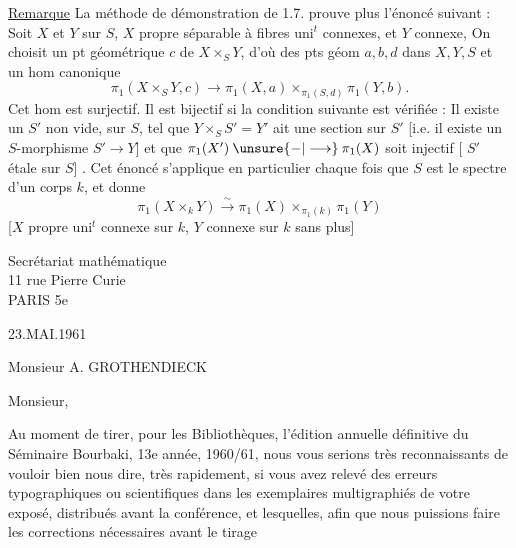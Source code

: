 \uline{Remarque} La méthode de démonstration de 1.7. prouve plus
 l'énoncé suivant : Soit $X$ et $Y$ sur $S$,
$X$ propre  séparable à fibres
$\mathrm{uni}^t$ connexes, et $Y$ connexe,
On choisit un pt géométrique $c$ de $X\times_S Y$, d'où des pts géom
$a,b,d$ dans $X,Y,S$ et un hom canonique
\[
\pi_1(X\times_S Y,c)\longrightarrow
\pi_1(X,a)\mathbin{\times_{\pi_1(S,d)}}\pi_1(Y,b).
\]
Cet hom est surjectif. 
Il est bijectif si
la condition suivante est vérifiée : Il existe un $S'$
non vide,  sur $S$, tel que
$Y\times_S S'=Y'$ ait une section sur $S'$
[i.e.  il existe un $S$-morphisme $S'\to Y$]
et que $\pi_1(X')\mathbin{\unsure{-|\longrightarrow}}\pi_1(X)$ soit
injectif [ $S'$ étale sur $S$]
.
Cet énoncé s'applique en particulier chaque fois que $S$ est le spectre
d'un corps $k$, et donne
\[
\pi_1(X\times_k Y)\xrightarrow{\sim}
\pi_1(X)\mathbin{\times_{\pi_1(k)}}\pi_1(Y)
\]
[$X$ propre $\mathrm{uni}^t$ connexe sur $k$, $Y$
 connexe sur $k$ sans plus]


Secrétariat mathématique\\
11 rue Pierre Curie\\
PARIS 5e

\hfill 23.MAI.1961

\hfill Monsieur A. GROTHENDIECK

Monsieur,

Au moment de tirer, pour les Bibliothèques, l'édition annuelle définitive
du Séminaire Bourbaki, 13e année, 1960/61, nous vous serions très reconnaissants
de vouloir bien nous dire, très rapidement, si vous avez relevé des erreurs
typographiques ou scientifiques dans les exemplaires multigraphiés de votre
exposé, distribués avant la conférence, et lesquelles, afin que nous puissions
faire les corrections nécessaires avant le tirage

